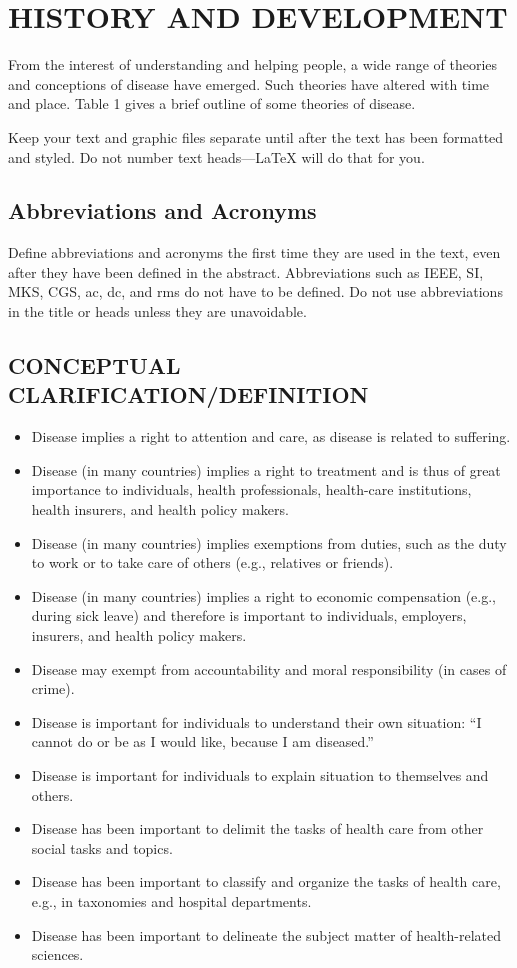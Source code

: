 \documentclass[conference]{IEEEtran}
\begin{document}
\section{HISTORY AND DEVELOPMENT}
From the interest of understanding and helping people, a wide range of theories and conceptions of disease have emerged. Such theories have altered with time and place. Table 1 gives a brief outline of some theories of disease.

Keep your text and graphic files separate until after the text has been 
formatted and styled. Do not number text heads---{\LaTeX} will do that 
for you.

\subsection{Abbreviations and Acronyms}\label{AA}
Define abbreviations and acronyms the first time they are used in the text, 
even after they have been defined in the abstract. Abbreviations such as 
IEEE, SI, MKS, CGS, ac, dc, and rms do not have to be defined. Do not use 
abbreviations in the title or heads unless they are unavoidable.

\subsection{CONCEPTUAL CLARIFICATION/DEFINITION}
\begin{itemize}
\item Disease implies a right to attention and care, as disease is related to suffering.
\item Disease (in many countries) implies a right to treatment and is thus of great importance to individuals, health professionals, health-care institutions, health insurers, and health policy makers.
\item Disease (in many countries) implies exemptions from duties, such as the duty to work or to take care of others (e.g., relatives or friends).
\item Disease (in many countries) implies a right to economic compensation (e.g., during sick leave) and therefore is important to individuals, employers, insurers, and health policy makers.
\item Disease may exempt from accountability and moral responsibility (in cases of crime).
\item Disease is important for individuals to understand their own situation: “I cannot do or be as I would like, because I am diseased.”
\item Disease is important for individuals to explain  situation to themselves and others.
\item Disease has been important to delimit the tasks of health care from other social tasks and topics.
\item Disease has been important to classify and organize the tasks of health care, e.g., in taxonomies and hospital departments.
\item Disease has been important to delineate the subject matter of health-related sciences.
\end{itemize}
\end{document}
